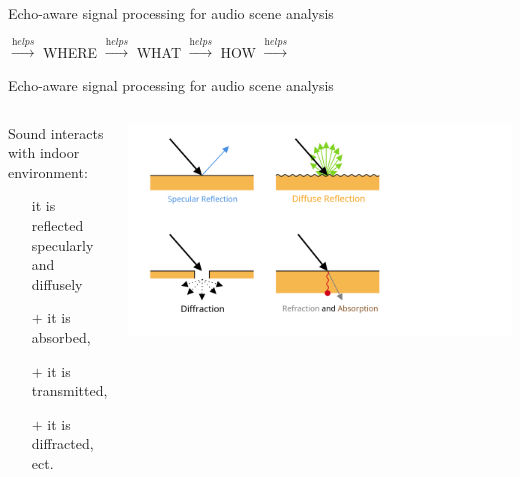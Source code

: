 \begin{frame}[t]{Echo-aware \alert{signal processing} for audio scene analysis}
    \pause
    \begin{center}
          $\xrightarrow{\textit{helps}}$ WHERE
            $\xrightarrow{\textit{helps}}$ WHAT
            $\xrightarrow{\textit{helps}}$ HOW
            $\xrightarrow{\textit{helps}}$ 
    \end{center}

    \pause

\end{frame}


\begin{frame}[t]{\alert{Echo-aware} signal processing for audio scene analysis}

    \begin{columns}[onlytextwidth]
        \begin{block}{Sound interacts with indoor environment:}
            \small
            \begin{itemize}
                \item[] it is reflected
                \\\hspace{1em} specularly and diffusely\hspace{1em}
                \item[$+$] it is absorbed,
                \item[$+$] it is transmitted,
                \item[$+$] it is diffracted, ect.
            \end{itemize}
        \end{block}

        \includegraphics[trim={0 0 50 0},clip,width=\textwidth]{figures/sound_refletion.png}
    \end{columns}


\end{frame}
